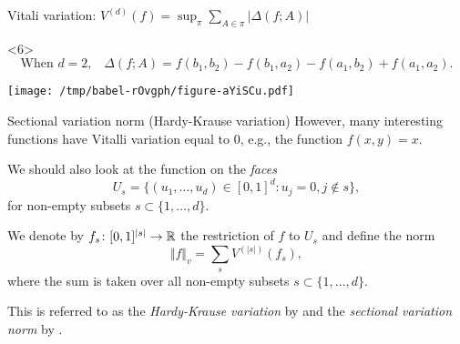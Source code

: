 \documentclass[smaller]{beamer}\usepackage{listings}
\begin{document}
\begin{frame}[label={sec:org2588226}]{Vitali variation: \normalsize \(V^{(d)}(f) = \sup_{\pi} \sum_{A \in \pi} | \Delta(f;A)|\)}
\begin{onlyenv}<6>
\small
\color{black}
\begin{equation*}
  \text{When \(d=2\),} \quad 
  \Delta(f;A) = f(b_1, b_2) - f(b_1, a_2) - f(a_1, b_2) + f(a_1, a_2).
\end{equation*}
\color{black}

\vfill

\begin{center}
\texttt{[image: /tmp/babel-rOvgph/figure-aYiSCu.pdf]}
\end{center}
\end{onlyenv}
\end{frame}


\begin{frame}[label={sec:org2892906}]{Sectional variation norm (Hardy-Krause variation)}
However, many interesting functions have Vitalli variation equal to 0, e.g., the
function $f(x,y) = x$.

\vfill \pause We should also look at the function on the \textit{faces}
\begin{equation*}
  U_s = \{(u_1, \dots, u_d) \in [0,1]^d : u_j = 0, j \not\in s \},
\end{equation*}
for non-empty subsets \(s \subset \{1, \dots, d\}\).

\vfill \pause
We denote by \(f_s \colon [0,1]^{|s|} \rightarrow \mathbb{R}\) the restriction of \(f\)
to \(U_s\) and define the norm
\begin{equation*}
  \Vert f \Vert_{v} = \sum_{s} V^{(|s|)}(f_s),
\end{equation*}
where the sum is taken over all non-empty subsets \(s \subset \{1, \dots, d\}\).

\vfill

This is referred to as the \emph{Hardy-Krause variation} by
\cite{fang2021multivariate} and the \emph{sectional variation norm} by
\cite{van2017generally}.
\end{frame}
\end{document}
